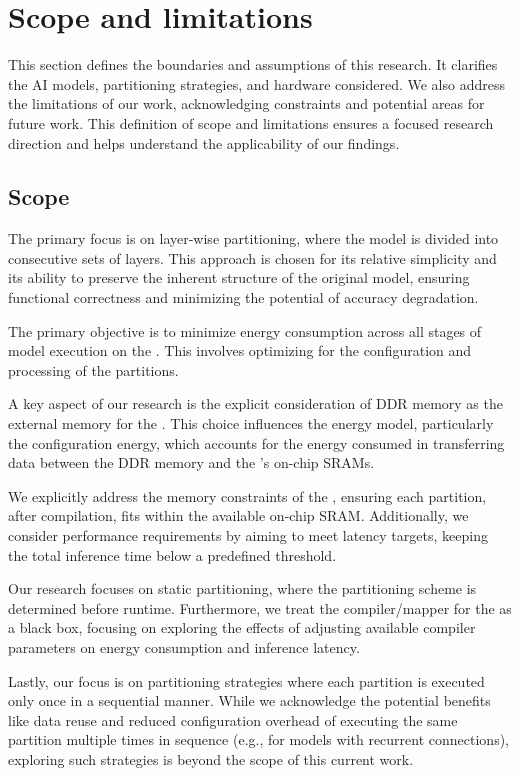 \section{Scope and limitations}
This section defines the boundaries and assumptions of this research.
It clarifies the AI models, partitioning strategies, and hardware considered.
We also address the limitations of our work, acknowledging constraints and potential areas for future work.
This definition of scope and limitations ensures a focused research direction and helps understand the applicability of our findings.

\subsection{Scope}
The primary focus is on layer-wise partitioning, where the model is divided into consecutive sets of layers.
This approach is chosen for its relative simplicity and its ability to preserve the inherent structure of the original model, ensuring functional correctness and minimizing the potential of accuracy degradation.

The primary objective is to minimize energy consumption across all stages of model execution on the \graicore{}.
This involves optimizing for the configuration and processing of the partitions.

A key aspect of our research is the explicit consideration of DDR memory as the external memory for the \graicore{}.
This choice influences the energy model, particularly the configuration energy, which accounts for the energy consumed in transferring data between the DDR memory and the \graicore{}'s on-chip SRAMs.

We explicitly address the memory constraints of the \graicore{}, ensuring each partition, after compilation, fits within the available on-chip SRAM.
Additionally, we consider performance requirements by aiming to meet latency targets, keeping the total inference time below a predefined threshold.

Our research focuses on static partitioning, where the partitioning scheme is determined before runtime.
Furthermore, we treat the compiler/mapper for the \graicore{} as a black box, focusing on exploring the effects of adjusting available compiler parameters on energy consumption and inference latency.

Lastly, our focus is on partitioning strategies where each partition is executed only once in a sequential manner.
While we acknowledge the potential benefits like data reuse and reduced configuration overhead of executing the same partition multiple times in sequence (e.g., for models with recurrent connections),
exploring such strategies is beyond the scope of this current work.

